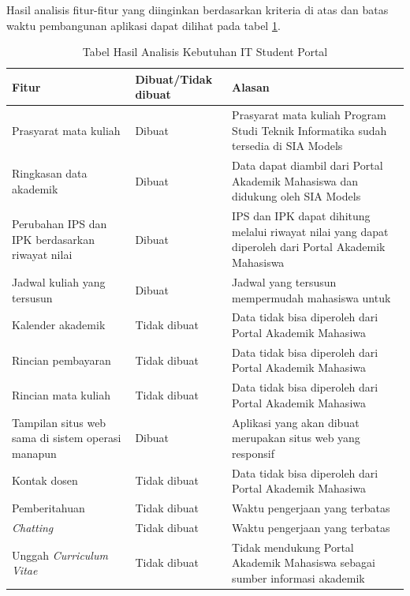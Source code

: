 Hasil analisis fitur-fitur yang diinginkan berdasarkan kriteria di atas dan batas waktu pembangunan aplikasi dapat dilihat pada tabel \ref{tab:3_hasil_fitur}.
\begin{table}[H]
	\centering
    \begin{tabular}{|p{4.5cm}|p{2.5cm}|p{8cm}|}
		\hline
		\hline
		Fitur & Dibuat/Tidak dibuat & Alasan\\
		\hline
		Prasyarat mata kuliah                             & Dibuat       & Prasyarat mata kuliah Program Studi Teknik Informatika sudah tersedia di SIA Models                   \\
		\hline
    Ringkasan data akademik                               & Dibuat       & Data dapat diambil dari Portal Akademik Mahasiswa dan didukung oleh SIA Models                        \\
		\hline
    Perubahan IPS dan IPK berdasarkan riwayat nilai   & Dibuat       &  IPS dan IPK dapat dihitung melalui riwayat nilai yang dapat diperoleh dari Portal Akademik Mahasiswa \\
		\hline
    Jadwal kuliah yang tersusun                       & Dibuat       & Jadwal yang tersusun mempermudah mahasiswa untuk                                                      \\
		\hline
    Kalender akademik                                 & Tidak dibuat & Data tidak bisa diperoleh dari Portal Akademik Mahasiwa                                               \\
		\hline
    Rincian pembayaran                                & Tidak dibuat & Data tidak bisa diperoleh dari Portal Akademik Mahasiwa                                               \\
		\hline
    Rincian mata kuliah                               & Tidak dibuat & Data tidak bisa diperoleh dari Portal Akademik Mahasiwa                                               \\
		\hline
    Tampilan situs web sama di sistem operasi manapun & Dibuat       & Aplikasi yang akan dibuat merupakan situs web yang responsif                                          \\
		\hline
    Kontak dosen                                      & Tidak dibuat & Data tidak bisa diperoleh dari Portal Akademik Mahasiwa                                               \\
		\hline
    Pemberitahuan                                     & Tidak dibuat & Waktu pengerjaan yang terbatas                                                                        \\
		\hline
    \textit{Chatting}                                          & Tidak dibuat & Waktu pengerjaan yang terbatas                                                                        \\
		\hline
    Unggah \textit{Curriculum Vitae}                           & Tidak dibuat & Tidak mendukung Portal Akademik Mahasiswa sebagai sumber informasi akademik                           \\
		\hline
		\end{tabular}
		\caption{Tabel Hasil Analisis Kebutuhan IT Student Portal}
	\label{tab:3_hasil_fitur}
\end{table}


